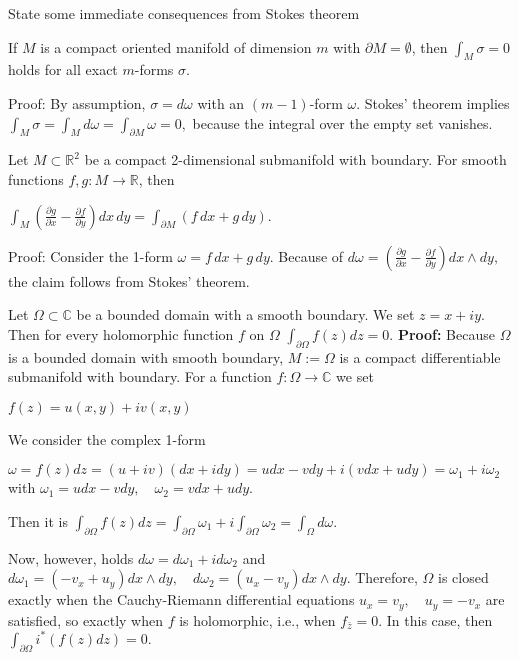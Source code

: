 State some immediate consequences from Stokes theorem

If \(M\) is a compact oriented manifold of dimension \(m\) with \(\partial M = \emptyset\), then
\(\int_{M} \sigma = 0\)
holds for all exact \(m\)-forms \(\sigma\).

Proof: By assumption, \(\sigma = d\omega\) with an \((m-1)\)-form \(\omega\). Stokes' theorem implies
\(\int_{M} \sigma = \int_{M} d\omega = \int_{\partial M} \omega = 0,\)
because the integral over the empty set vanishes.

Let \(M \subset \mathbb{R}^2\) be a compact 2-dimensional submanifold with boundary. For smooth functions \(f, g: M \rightarrow \mathbb{R}\), then 

\(\int_M \left( \frac{\partial g}{\partial x} - \frac{\partial f}{\partial y} \right) dx \, dy = \int_{\partial M} (f \, dx + g \, dy).\)

Proof: 
Consider the 1-form \(\omega = f \, dx + g \, dy\). 
Because of
\(d\omega = \left( \frac{\partial g}{\partial x} - \frac{\partial f}{\partial y} \right) dx \wedge dy,\)
the claim follows from Stokes' theorem.

Let \(\Omega \subset \mathbb{C}\) be a bounded domain with a smooth boundary. We set \(z = x + iy\). Then for every holomorphic function \(f\) on \(\Omega\)
\(\int_{\partial \Omega} f(z) dz = 0.\)
\textbf{Proof:} 
Because \(\Omega\) is a bounded domain with smooth boundary, \(M := \Omega\) is a compact differentiable submanifold with boundary. 
For a function \(f: \Omega \rightarrow \mathbb{C}\) we set 

\(f(z) = u(x,y) + i v(x, y)\)

We consider the complex 1-form

\(\omega = f(z)dz = (u + iv)(dx + idy) = u dx - v dy + i (v dx + u dy) = \omega_1 + i \omega_2\)
with 
\(\omega_1 = u dx - v dy, \quad \omega_2 = v dx + u dy.\)

Then it is
\(\int_{\partial \Omega} f(z) dz = \int_{\partial \Omega} \omega_1 + i \int_{\partial \Omega} \omega_2 = \int_{\Omega} d\omega.\)

Now, however, holds
\(d\omega = d\omega_1 + i d\omega_2 \)
and 
\(d\omega_1 = (-v_x + u_y) dx \wedge dy, \quad d\omega_2 = (u_x - v_y) dx \wedge dy.\)
Therefore, \(\Omega\) is closed exactly when the Cauchy-Riemann differential equations
\(u_x = v_y, \quad u_y = -v_x\)
are satisfied, so exactly when \(f\) is holomorphic, i.e., when \(f_{\bar{z}} = 0\). In this case, then
\(\int_{\partial \Omega} i^* (f(z)dz) = 0.\)



